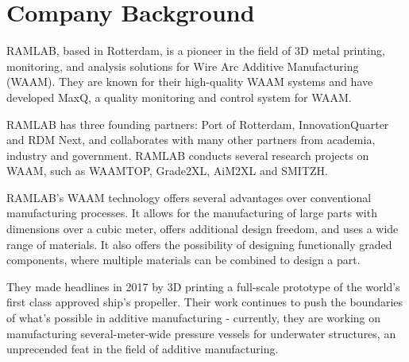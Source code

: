 \section{Company Background}

RAMLAB, based in Rotterdam, is a pioneer in the field of 3D metal printing, monitoring, and analysis solutions for Wire Arc Additive Manufacturing (WAAM). They are known for their high-quality WAAM systems and have developed MaxQ, a quality monitoring and control system for WAAM.

RAMLAB has three founding partners: Port of Rotterdam, InnovationQuarter and RDM Next, and collaborates with many other partners from academia, industry and government. RAMLAB conducts several research projects on WAAM, such as WAAMTOP, Grade2XL, AiM2XL and SMITZH.

RAMLAB's WAAM technology offers several advantages over conventional manufacturing processes. It allows for the manufacturing of large parts with dimensions over a cubic meter, offers additional design freedom, and uses a wide range of materials. It also offers the possibility of designing functionally graded components, where multiple materials can be combined to design a part.

They made headlines in 2017 by 3D printing a full-scale prototype of the world's first class approved ship's propeller. Their work continues to push the boundaries of what's possible in additive manufacturing - currently, they are working on manufacturing several-meter-wide pressure vessels for underwater structures, an unprecended feat in the field of additive manufacturing.


